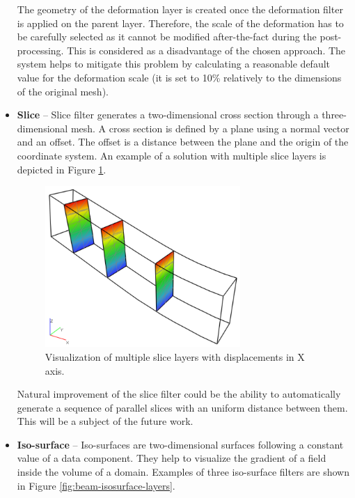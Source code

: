 \begin{itemize}
    The geometry of the deformation layer is created once the deformation filter is applied on the parent layer. Therefore, the scale of the deformation has to be carefully selected as it cannot be modified after-the-fact during the post-processing. This is considered as a disadvantage of the chosen approach. The system helps to mitigate this problem by calculating a reasonable default value for the deformation scale (it is set to 10\% relatively to the dimensions of the original mesh).

    \item \textbf{Slice} -- Slice filter generates a two-dimensional cross section through a three-dimensional mesh. A cross section is defined by a plane using a normal vector and an offset. The offset is a distance between the plane and the origin of the coordinate system. An example of a solution with multiple slice layers is depicted in Figure \ref{fig:beam-slice-layers}.
    
    \begin{figure}[H]
        \centering
        \includegraphics[width=0.7\textwidth]{figures/chapter-data-management/beam-slice-layers}
        \decoRule
        \caption[Visualization of multiple slice layers.]{Visualization of multiple slice layers with displacements in X axis.}
        \label{fig:beam-slice-layers}
    \end{figure}

    Natural improvement of the slice filter could be the ability to automatically generate a sequence of parallel slices with an uniform distance between them. This will be a subject of the future work.
    
    \item \textbf{Iso-surface} -- Iso-surfaces are two-dimensional surfaces following a constant value of a data component. They help to visualize the gradient of a field inside the volume of a domain. Examples of three iso-surface filters are shown in Figure \ref{fig:beam-isosurface-layers}.
    

\end{itemize}
